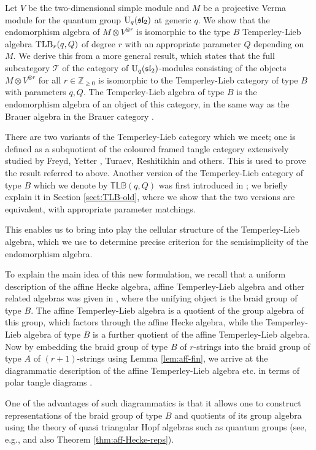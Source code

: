 \documentclass[12pt]{amsart}
\theoremstyle{definition}
\theoremstyle{remark}
\numberwithin{equation}{section}
\newcommand{\Z}{{\mathbb Z}}
\newcommand{\CT}{{\mathcal T}}
\newcommand{\U}{{\rm{U}}}
\newcommand{\tl}{Temperley-Lieb }
\newcommand{\fsl}{{\mathfrak {sl}}}
\newcommand{\TLB}{{\rm{TLB}}}
\newcommand{\TLBB}{{\mathbb{TLB}}}
\begin{document}
Let $V$ be the two-dimensional simple module and $M$ be a projective Verma module for the quantum group $\U_q(\fsl_2)$ at generic $q$.  
We show that the endomorphism algebra of $M\otimes V^{\otimes r}$ is isomorphic to the type $B$ \tl algebra $\TLB_r(q, Q)$ of degree $r$ 
with an appropriate parameter $Q$ depending on $M$. 
We derive this from a more general result, which states that the full subcategory $\CT$ of the category of $\U_q(\fsl_2)$-modules consisting 
of the objects $M\otimes V^{\otimes r}$ for all $r\in\Z_{\ge 0}$ is isomorphic to the \tl category of type $B$ \cite{GL03} with parameters $q,Q$.  
The \tl algebra of type $B$ is the endomorphism algebra of an object of this category, 
in the same way as the Brauer algebra in the Brauer category \cite{LZ14}. 

There are two variants of the \tl category which we meet; one is defined as a subquotient of the coloured framed
 tangle category extensively studied by Freyd, Yetter \cite{FY}, Turaev, Reshitikhin \cite{RT, RT-1, T} 
 and others. This is used to prove the result referred to above.
Another version of the  \tl category of type $B$ which we denote by $\TLBB(q,Q)$ was first introduced in \cite{GL03};  
we briefly explain it in Section \ref{sect:TLB-old},
where we show that the two versions are equivalent, with appropriate parameter matchings. 

This enables us to bring into play the cellular structure of the \tl algebra, which we use to determine precise criterion for 
the semisimplicity of the endomorphism algebra.

To explain the main idea of this new formulation, we recall that a uniform description of the affine Hecke algebra, affine \tl 
algebra and other related algebras was given in \cite{GL03}, where the unifying object is the braid group of type $B$. 
The affine \tl algebra is a quotient of the group algebra of this group, which factors through the affine Hecke algebra,
 while the  \tl  algebra of type $B$ is a further quotient of the affine \tl algebra. Now by embedding the  braid group of 
 type $B$ of $r$-strings into the braid group of type $A$ of $(r+1)$-strings using Lemma \ref{lem:aff-fin}, we arrive at 
 the diagrammatic description of the affine \tl algebra etc. in terms of polar tangle diagrams \cite{A, DRV}.  

One of the advantages of such diagrammatics is that it allows one to construct representations of the braid group of type $B$ 
and quotients of its group algebra using the theory of quasi triangular Hopf algebras such as quantum groups 
 (see, e.g., \cite{DRV, LZ06} and also Theorem \ref{thm:aff-Hecke-reps}).
\end{document}
